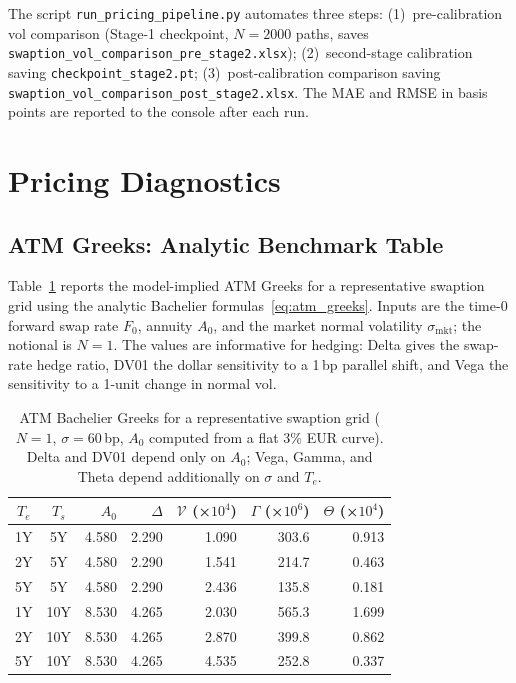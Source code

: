The script \texttt{run\_pricing\_pipeline.py} automates three steps: (1)~pre-calibration
vol comparison (Stage-1 checkpoint, $N=2000$ paths, saves
\texttt{swaption\_vol\_comparison\_pre\_stage2.xlsx}); (2)~second-stage calibration
saving \texttt{checkpoint\_stage2.pt}; (3)~post-calibration comparison saving
\texttt{swaption\_vol\_comparison\_post\_stage2.xlsx}. The MAE and RMSE in basis points
are reported to the console after each run.

\section{Pricing Diagnostics}
\label{sec:pricing_diagnostics}

\subsection{ATM Greeks: Analytic Benchmark Table}
\label{subsec:greeks_table}

Table~\ref{tab:atm_greeks} reports the model-implied ATM Greeks for a representative
swaption grid using the analytic Bachelier formulas~\eqref{eq:atm_greeks}.
Inputs are the time-$0$ forward swap rate $F_0$, annuity $A_0$, and the market normal
volatility $\sigma_\mathrm{mkt}$; the notional is $N=1$. The values are informative for
hedging: Delta gives the swap-rate hedge ratio, DV01 the dollar sensitivity to a 1\,bp
parallel shift, and Vega the sensitivity to a 1-unit change in normal vol.

\begin{table}[H]
\centering
\caption{ATM Bachelier Greeks for a representative swaption grid
($N=1$, $\sigma=60$\,bp, $A_0$ computed from a flat 3\% EUR curve).
Delta and DV01 depend only on $A_0$; Vega, Gamma, and Theta depend additionally
on $\sigma$ and $T_e$.}
\label{tab:atm_greeks}
\begin{tabular}{@{}ccrrrrr@{}}
\toprule
$T_e$ & $T_s$ & $A_0$ & $\Delta$ & $\mathcal{V}$ (×$10^4$) & $\Gamma$ (×$10^6$) & $\Theta$ (×$10^4$) \\
\midrule
1Y & 5Y  & 4.580 & 2.290 & 1.090 & 303.6 & 0.913 \\
2Y & 5Y  & 4.580 & 2.290 & 1.541 & 214.7 & 0.463 \\
5Y & 5Y  & 4.580 & 2.290 & 2.436 & 135.8 & 0.181 \\
1Y & 10Y & 8.530 & 4.265 & 2.030 & 565.3 & 1.699 \\
2Y & 10Y & 8.530 & 4.265 & 2.870 & 399.8 & 0.862 \\
5Y & 10Y & 8.530 & 4.265 & 4.535 & 252.8 & 0.337 \\
\bottomrule
\end{tabular}
\end{table}

